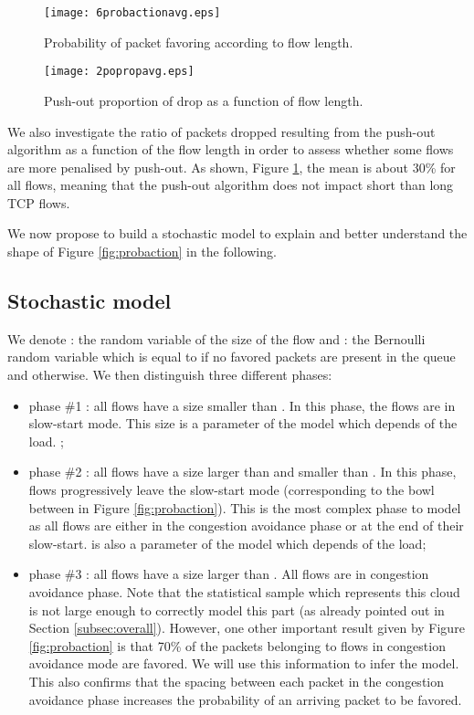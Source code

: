 \documentclass{elsart}
\begin{document}
\begin{figure}[htb!]
   \begin{minipage}[b]{1.0\columnwidth}
	\centering
	\texttt{[image: 6probactionavg.eps]}
	\caption{Probability of packet favoring according to flow length.}
	\label{fig:probaction}
   \end{minipage}

   \begin{minipage}[b]{1.0\columnwidth}   
	\centering
	\texttt{[image: 2popropavg.eps]}
	\caption{Push-out proportion of drop as a function of flow length.}
	\label{fig:propo}
   \end{minipage}
\end{figure}

We also investigate the ratio of packets dropped resulting from the push-out algorithm as a function of the flow length in order to assess whether some flows are more penalised by push-out.
As shown, Figure \ref{fig:propo}, the mean is about 30\% for all flows, meaning that the push-out algorithm does not impact short than long TCP flows.

We now propose to build a stochastic model to explain and better understand the shape of Figure \ref{fig:probaction} in the following.


\subsection{Stochastic model}

We denote : the random variable of the size of the flow and : the Bernoulli random variable which is equal to  if no favored packets are present in the queue and  otherwise.
We then distinguish three different phases:
\begin{itemize}
	\item phase \#1 : all flows have a size smaller than . In this phase, the flows are in slow-start mode. This size is a parameter of the model which depends of the load. ;
	\item phase \#2 : all flows have a size larger than  and smaller than .  In this phase, flows progressively leave the slow-start mode (corresponding to the  bowl between  in Figure \ref{fig:probaction}). This is the most complex phase to model as all flows are either in the congestion avoidance phase or at the end of their slow-start.  is also a parameter of the model which depends of the load;
	\item phase \#3 : all flows have a size larger than . All flows are in congestion avoidance phase. Note that the statistical sample which represents this cloud is not large enough to correctly model this part (as already pointed out in Section \ref{subsec:overall}). However, one other important result given by Figure \ref{fig:probaction} is that 70\% of the packets belonging to flows in congestion avoidance mode are favored. We will use this information to infer the model. This also confirms that the spacing between each packet in the congestion avoidance phase increases the probability of an arriving packet to be favored. 
\end{itemize}
\end{document}
